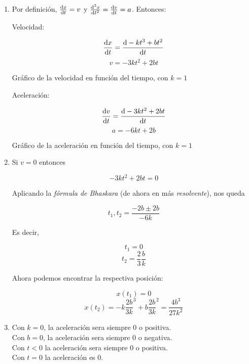 \begin{enumerate}

\item

	Por definici\'on, $\dv{x}{t} = v$ y $\dv[2]{x}{t} = \dv{v}{t} = a$. Entonces:

	Velocidad:

	$$ \dv{x}{t} = \dv{-kt^3 + bt^2}{t} $$
	$$ v = -3kt^2 + 2bt $$

	Gr\'afico de la velocidad en funci\'on del tiempo, con $k=1$

	

	Aceleraci\'on:

	$$ \dv{v}{t} = \dv{-3kt^2 + 2bt}{t} $$
	$$ a = -6kt + 2b $$

	Gr\'afico de la aceleraci\'on en funci\'on del tiempo, con $k=1$

	

\item

	Si $v = 0$ entonces
	
	$$ -3kt^2 + 2bt = 0$$
	
	Aplicando la \emph{f\'ormula de Bhaskara} (de ahora en m\'as \emph{resolvente}), nos queda
	
	$$ t_1, t_2 = \frac{-2b \pm 2b}{-6k} $$
	
	Es decir,
	
	$$ t_1 = 0$$
	$$ t_2 = \frac{2}{3} \frac{b}{k}$$
	
	Ahora podemos encontrar la respectiva posici\'on:
	
	$$ x(t_1) = 0 $$
	$$ x(t_2) = -k \frac{2b}{3k}^3 + b\frac{2b}{3k}^2 = \frac{4b^3}{27k^2}$$
	
\item

	Con $k = 0$, la aceleraci\'on sera siempre 0 o positiva. \\
	Con $b = 0$, la aceleraci\'on sera siempre 0 o negativa. \\
	Con $t < 0$ la aceleraci\'on sera siempre 0 o positiva. \\
	Con $t = 0$ la aceleraci\'on es 0.

\end{enumerate}